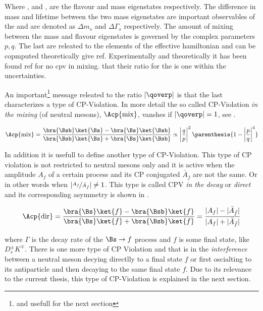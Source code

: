 \noindent Where \ket{\Bs}, \ket{\Bsb} and ,  are the flavour and mass
eigenstates respectively. The difference in mass and lifetime between the two mass eigenstates are important
observables of the \BBbarSyst and are denoted as $\Delta m_s$ and $\Delta\Gamma_s$ respectively.
The amount of mixing between the mass and flavour eigenstates is governed by
the complex parameters $p,q$. The last are releated to the elements of the effective hamiltonian and can be
copmputed theoretically{\color{red} give ref}. Experimentally and theoretically it has been found{\color{red} ref for no cpv in mixing.}
that their ratio for the \BBbarSyst is one within the uncertainties.

An important\footnote{and usefull for the next section} message releated to the ratio $|\qoverp|$ is that
the last characterizes a type of CP-Violation. In more detail the so called CP-Violation {\it in the mixing} (of neutral mesons),
$\Acp{\text{mix}}$, vanshes if $|\qoverp|= 1$, see .

\begin{equation}
\Acp{\text{mix}}      = \frac{\bra{\Bsb}\ket{\Bs} - \bra{\Bs}\ket{\Bsb}} {\bra{\Bsb}\ket{\Bs} + \bra{\Bs}\ket{\Bsb}}
                \propto \left|\frac{q}{p}\right|^2 \parenthesis{ 1 - \left|\frac{p}{q}\right|^4}
\label{acp_mixing}
\end{equation}

\noindent In addition it is usefull to define another type of CP-Violation.
This type of CP violation is not restricted to neutral mesons only and it is active when the amplitude $A_f$ of a certain
process and its CP conjugated $\bar{A}_{\bar{f}}$ are not the same. Or in other words when $|\nicefrac{A_f}{\bar{A}_{\bar{f}}}| \neq 1$.
This type is called CPV {\it in the decay} or {\it direct} and its corresponding asymmetry is shown in .

\begin{equation}
\Acp{\text{dir}} = \frac{ \bra{\Bs}\ket{f} - \bra{\Bsb}\ket{f} } {\bra{\Bs}\ket{f} + \bra{\Bsb}\ket{f}}
                = \frac{ |A_f| - |\bar{A}_{\bar{f}}| } { |A_f| + |\bar{A}_{\bar{f}}|}
\label{cpv_decay}
\end{equation}

\noindent where $\Gamma$ is the decay rate of the $\Bs \rightarrow f$ process and $f$ is some final state,
like $D_s^{\pm}K^{\mp}$. There is one more type of CP Violation and that is in the {\it interference} between
a neutral meson decying directlly to a final state $f$ or first oscialting to its antiparticle and then decaying
to the same final state $f$. Due to its relevance to the current thesis, this type of CP-Violation is explained
in the next section.
